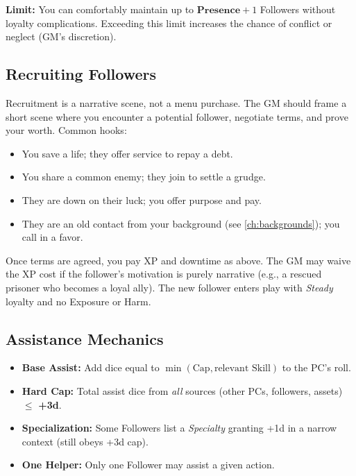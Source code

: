 \textbf{Limit:} You can comfortably maintain up to \(\textbf{Presence} + 1\) Followers without loyalty complications. Exceeding this limit increases the chance of conflict or neglect (GM's discretion).

\subsection*{Recruiting Followers}
Recruitment is a narrative scene, not a menu purchase. The GM should frame a short scene where you encounter a potential follower, negotiate terms, and prove your worth. Common hooks:
\begin{itemize}
  \item You save a life; they offer service to repay a debt.
  \item You share a common enemy; they join to settle a grudge.
  \item They are down on their luck; you offer purpose and pay.
  \item They are an old contact from your background (see \ref{ch:backgrounds}); you call in a favor.
\end{itemize}
Once terms are agreed, you pay XP and downtime as above. The GM may waive the XP cost if the follower's motivation is purely narrative (e.g., a rescued prisoner who becomes a loyal ally). The new follower enters play with \emph{Steady} loyalty and no Exposure or Harm.

\subsection*{Assistance Mechanics}
\begin{itemize}
  \item \textbf{Base Assist:} Add dice equal to \(\min(\text{Cap}, \text{relevant Skill})\) to the PC's roll.
  \item \textbf{Hard Cap:} Total assist dice from \emph{all} sources (other PCs, followers, assets) \(\leq\) \textbf{+3d}. 
  \item \textbf{Specialization:} Some Followers list a \emph{Specialty} granting +1d in a narrow context (still obeys +3d cap).
  \item \textbf{One Helper:} Only one Follower may assist a given action.
\end{itemize}

